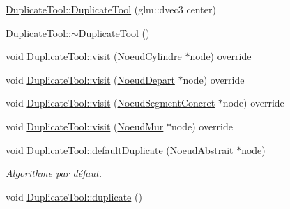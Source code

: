\begin{DoxyCompactItemize}
\hyperlink{group__inf2990_ga13dd0524e005f4a44dbaeea9f237d761}{Duplicate\-Tool\-::\-Duplicate\-Tool} (glm\-::dvec3 center)
\item 
\hyperlink{group__inf2990_gaab141bc62b424e5e0bfc48bd899bcb8a}{Duplicate\-Tool\-::$\sim$\-Duplicate\-Tool} ()
\item 
void \hyperlink{group__inf2990_gab91de27487440694048c1a0fbcc74da7}{Duplicate\-Tool\-::visit} (\hyperlink{class_noeud_cylindre}{Noeud\-Cylindre} $\ast$node) override
\item 
void \hyperlink{group__inf2990_ga5fa8bbf01a90c95062c8104ebdf5bb62}{Duplicate\-Tool\-::visit} (\hyperlink{class_noeud_depart}{Noeud\-Depart} $\ast$node) override
\item 
void \hyperlink{group__inf2990_gaa8f5663adbfe6f00a2c2f79083339e30}{Duplicate\-Tool\-::visit} (\hyperlink{class_noeud_segment_concret}{Noeud\-Segment\-Concret} $\ast$node) override
\item 
void \hyperlink{group__inf2990_ga9b9e4456490e59603f3d8924fdf19c18}{Duplicate\-Tool\-::visit} (\hyperlink{class_noeud_mur}{Noeud\-Mur} $\ast$node) override
\item 
void \hyperlink{group__inf2990_ga4708caab32b10170d24dba25d4829677}{Duplicate\-Tool\-::default\-Duplicate} (\hyperlink{class_noeud_abstrait}{Noeud\-Abstrait} $\ast$node)
\begin{DoxyCompactList}\small\item\em Algorithme par défaut. \end{DoxyCompactList}\item 
\hypertarget{group__inf2990_gadbe76417e934ddabc6df18141162fe2c}{void \hyperlink{group__inf2990_gadbe76417e934ddabc6df18141162fe2c}{Duplicate\-Tool\-::duplicate} ()}\label{group__inf2990_gadbe76417e934ddabc6df18141162fe2c}


\end{DoxyCompactItemize}
